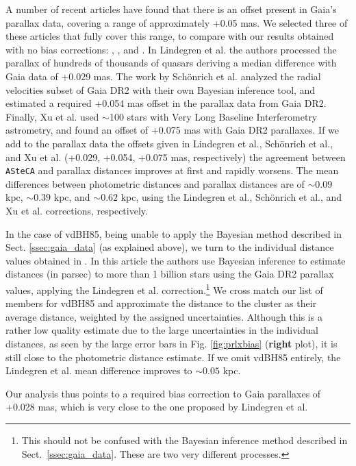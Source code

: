 \documentclass[draft]{aa}
\begin{document}
A number of recent articles have found that there is an offset present in
Gaia's parallax data, covering a range of approximately +0.05 mas. We selected
three of these articles that fully cover this range, to compare with our
results obtained with no bias corrections: \cite{Lindegren_2018},
\cite{Schonrich2019}, and \cite{Xu_2019}.
%
In Lindegren et al. the authors processed the parallax of hundreds of
thousands of quasars deriving a median difference with Gaia data of +0.029 mas.
The work by Sch\"onrich et al. analyzed the radial velocities subset of Gaia
DR2 with their own Bayesian inference tool, and estimated a required +0.054 mas
offset in the parallax data from Gaia DR2. Finally, Xu et al. used $\sim$100
stars with Very Long Baseline Interferometry astrometry, and found an offset of
+0.075 mas with Gaia DR2 parallaxes. 
%
If we add to the parallax data the offsets given in Lindegren et al., 
Sch\"onrich et al., and Xu et al. (+0.029, +0.054, +0.075 mas,
respectively) the agreement between \texttt{ASteCA} and parallax distances
improves at first and rapidly worsens. The mean differences between photometric
distances and parallax distances are of $\sim0.09$ kpc, $\sim0.39$ kpc, and
$\sim0.62$ kpc, using the Lindegren et al., Sch\"onrich et al., and Xu
et al. corrections, respectively.

In the case of vdBH85, being unable to apply the Bayesian method
described in Sect. \ref{ssec:gaia_data} (as explained above), we turn
to the individual distance values obtained in
\cite{BailerJones_2018}.
In this article the authors use Bayesian inference to estimate distances (in
parsec) to more than 1 billion stars using the Gaia DR2 parallax values,
applying the Lindegren et al. correction.\footnote{This should not be
confused with the Bayesian inference method described in
Sect.~\ref{ssec:gaia_data}. These are two very different processes.}
We cross match our list of members for vdBH85 and approximate the distance to
the cluster as their average distance, weighted by the assigned uncertainties.
Although this is a rather low quality estimate due to the large
uncertainties in the individual distances, as seen by the large error bars
in Fig. \ref{fig:prlxbias} (\textbf{right} plot), it is still close to the
photometric distance estimate.
If we omit vdBH85 entirely, the Lindegren et al. mean difference improves to
$\sim0.05$ kpc.

Our analysis thus points to a required bias correction to Gaia parallaxes of
+0.028 mas, which is very close to the one proposed by Lindegren et al.\\
\end{document}
